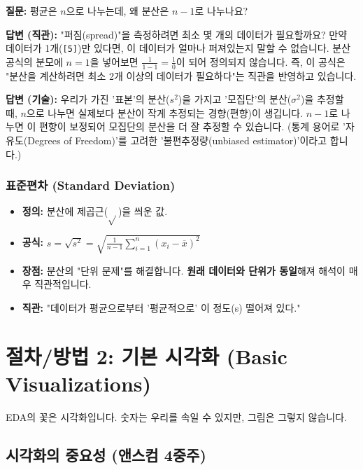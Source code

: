 \documentclass[11pt,a4paper]{book}
\theoremstyle{definition}
\begin{document}
\begin{examplebox}[title={Q\&A: 왜 $n$이 아니라 $n-1$로 나누나요?}]
\textbf{질문:} 평균은 $n$으로 나누는데, 왜 분산은 $n-1$로 나누나요?

\textbf{답변 (직관):} "퍼짐(spread)"을 측정하려면 최소 몇 개의 데이터가 필요할까요?
만약 데이터가 1개(\texttt{[5]})만 있다면, 이 데이터가 얼마나 퍼져있는지 말할 수 없습니다.
분산 공식의 분모에 $n=1$을 넣어보면 $\frac{1}{1-1} = \frac{1}{0}$이 되어 정의되지 않습니다.
즉, 이 공식은 "분산을 계산하려면 최소 2개 이상의 데이터가 필요하다"는 직관을 반영하고 있습니다.

\textbf{답변 (기술):} 우리가 가진 '표본'의 분산($s^2$)을 가지고 '모집단'의 분산($\sigma^2$)을 추정할 때, $n$으로 나누면 실제보다 분산이 작게 추정되는 경향(편향)이 생깁니다. $n-1$로 나누면 이 편향이 보정되어 모집단의 분산을 더 잘 추정할 수 있습니다. (통계 용어로 '자유도(Degrees of Freedom)'를 고려한 '불편추정량(unbiased estimator)'이라고 합니다.)
\end{examplebox}

\subsubsection{표준편차 (Standard Deviation)}

\begin{itemize}
    \item \textbf{정의:} 분산에 제곱근($\sqrt{}$)을 씌운 값.
    \item \textbf{공식:} $s = \sqrt{s^2} = \sqrt{\frac{1}{n-1}\sum_{i=1}^{n}(x_i - \overline{x})^2}$
    \item \textbf{장점:} 분산의 "단위 문제"를 해결합니다. \textbf{원래 데이터와 단위가 동일}해져 해석이 매우 직관적입니다.
    \item \textbf{직관:} "데이터가 평균으로부터 '평균적으로' 이 정도(s) 떨어져 있다."
\end{itemize}


\section{절차/방법 2: 기본 시각화 (Basic Visualizations)}

EDA의 꽃은 시각화입니다. 숫자는 우리를 속일 수 있지만, 그림은 그렇지 않습니다.

\subsection{시각화의 중요성 (앤스컴 4중주)}
\end{document}
